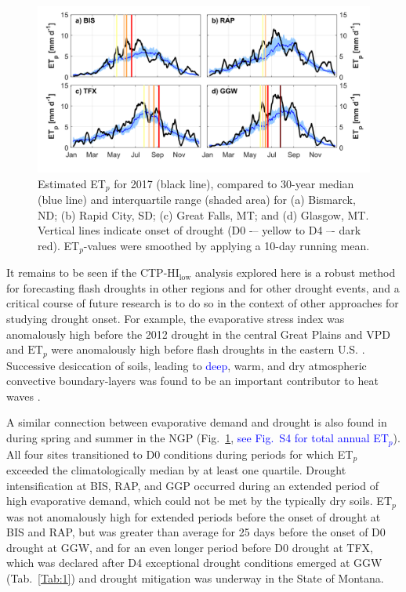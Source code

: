 \documentclass[hess, manuscript]{copernicus}
\def\TG{\textcolor{blue}}
\begin{document}
%
\begin{figure}[t]
\includegraphics[width=12cm]{./Figures/Climatology_ETp_rev.png}
\caption{Estimated ET$_p$ for 2017 (black line), compared to 30-year median (blue line) and interquartile range (shaded area) for (a) Bismarck, ND; (b) Rapid City, SD; (c) Great Falls, MT; and (d) Glasgow, MT. Vertical lines indicate onset of drought (D0 -– yellow to D4 –- dark red). ET$_p$-values were smoothed by applying a 10-day running mean. }\label{Fig:5}
\end{figure}

It remains to be seen if the CTP-$\mathrm{HI_{low}}$  analysis explored here is a robust method for forecasting flash droughts in other regions and for other drought events, and a critical course of future research is to do so in the context of other approaches for studying drought onset. For example, the evaporative stress index was anomalously high before the 2012 drought in the central Great Plains \citep{Otkin_2016} and VPD and $\mathrm{ET}_p$ were anomalously high before flash droughts in the eastern U.S. \citep{Ford_2017}. Successive desiccation of soils, leading to \TG{deep}, warm, and dry atmospheric convective boundary-layers was found to be an important contributor to heat waves \citep{Miralles_2014}. 

A similar connection between evaporative demand and drought is also found in during spring and summer in the NGP (Fig.~\ref{Fig:5}, \TG{see Fig.~S4 for total annual ET$_p$}). All four sites transitioned to D0 conditions during periods for which ET$_p$ exceeded the climatologically median by at least one quartile. Drought intensification at BIS, RAP, and GGP occurred during an extended period of high evaporative demand, which could not be met by the typically dry soils. ET$_p$ was not anomalously high for extended periods before the onset of drought at BIS and RAP, but was greater than average for 25 days before the onset of D0 drought at GGW, and for an even longer period before D0 drought at TFX, which was declared after D4 exceptional drought conditions emerged at GGW (Tab.~\ref{Tab:1}) and drought mitigation was underway in the State of Montana.
\end{document}
